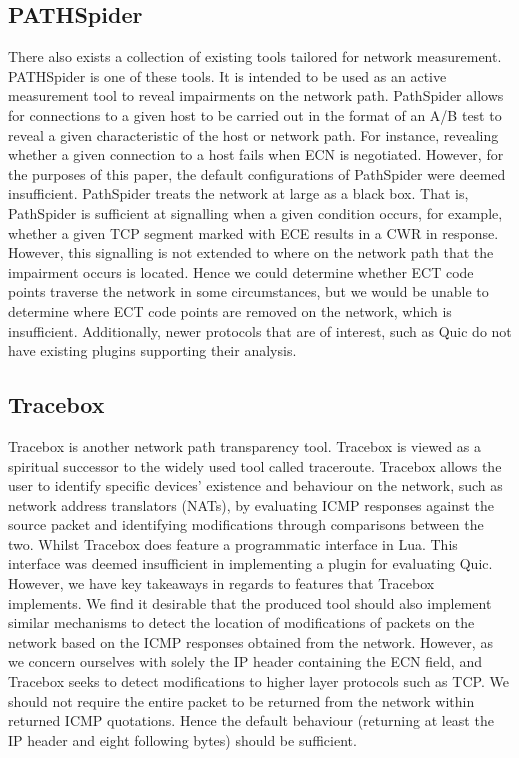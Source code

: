 \documentclass{l4proj}
\begin{document}
\subsection{PATHSpider}

There also exists a collection of existing tools tailored for network measurement. PATHSpider\citep{learmonth_pathspider_2016} is one of these tools. It is intended to be used as an active measurement tool to reveal impairments on the network path. PathSpider allows for connections to a given host to be carried out in the format of an A/B test to reveal a given characteristic of the host or network path\citep{learmonth_pathspider_2016}. For instance, revealing whether a given connection to a host fails when ECN is negotiated. However, for the purposes of this paper, the default configurations of PathSpider were deemed insufficient. PathSpider treats the network at large as a black box. That is, PathSpider is sufficient at signalling when a given condition occurs, for example, whether a given TCP segment marked with ECE results in a CWR in response. However, this signalling is not extended to where on the network path that the impairment occurs is located. Hence we could determine whether ECT code points traverse the network in some circumstances, but we would be unable to determine where ECT code points are removed on the network, which is insufficient. Additionally, newer protocols that are of interest, such as Quic do not have existing plugins supporting their analysis.

\subsection{Tracebox}

Tracebox is another network path transparency tool. Tracebox is viewed as a spiritual successor to the widely used tool called traceroute. Tracebox allows the user to identify specific devices' existence and behaviour on the network, such as network address translators (NATs), by evaluating ICMP responses against the source packet and identifying modifications through comparisons between the two\citep{vanaubel_tracebox_2013}. Whilst Tracebox does feature a programmatic interface in Lua. This interface was deemed insufficient in implementing a plugin for evaluating Quic. However, we have key takeaways in regards to features that Tracebox implements. We find it desirable that the produced tool should also implement similar mechanisms to detect the location of modifications of packets on the network based on the ICMP responses obtained from the network. However, as we concern ourselves with solely the IP header containing the ECN field, and Tracebox seeks to detect modifications to higher layer protocols such as TCP. We should not require the entire packet to be returned from the network within returned ICMP quotations. Hence the default behaviour (returning at least the IP header and eight following bytes) should be sufficient.
\end{document}
